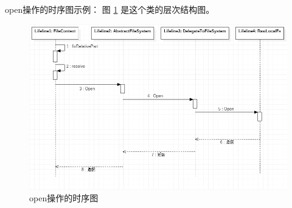 open操作的时序图示例：
图 \ref{fig:sequence} 是这个类的层次结构图。
\begin{figure}
\centering
\includegraphics[width=1\linewidth]{UML/abstractfilesystem/sequence.PNG}
\caption{open操作的时序图}
\label{fig:sequence}
\end{figure}

